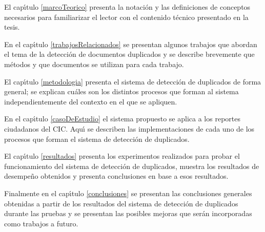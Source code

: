 El cap\'{\i}tulo \ref{marcoTeorico} presenta la notaci\'{o}n y las definiciones de conceptos necesarios para familiarizar el lector con el contenido t\'{e}cnico presentado en la tesis.

En el cap\'{\i}tulo \ref{trabajosRelacionados} se presentan algunos trabajos que abordan el tema de la detecci\'{o}n de documentos duplicados y se describe brevemente que m\'{e}todos y que documentos se utilizan para cada trabajo.

El cap\'{\i}tulo \ref{metodologia} presenta el sistema de detecci\'{o}n de duplicados de forma general; se explican cu\'{a}les son los distintos procesos que forman al sistema independientemente del contexto en el que se apliquen.

En el cap\'{\i}tulo \ref{casoDeEstudio} el sistema propuesto se aplica a los reportes ciudadanos del CIC. Aqu\'{\i} se describen las implementaciones de cada uno de los procesos que forman el sistema de detecci\'{o}n de duplicados.

El cap\'{\i}tulo \ref{resultados} presenta los experimentos realizados para probar el funcionamiento del sistema de detecci\'{o}n de duplicados, muestra los resultados de desempe\~{n}o obtenidos y presenta conclusiones en base a esos resultados.

Finalmente en el cap\'{\i}tulo \ref{conclusiones} se presentan las conclusiones generales obtenidas a partir de los resultados del sistema de detecci\'{o}n de duplicados durante las pruebas y se presentan las posibles mejoras que ser\'{a}n incorporadas como trabajos a futuro.

\clearpage
